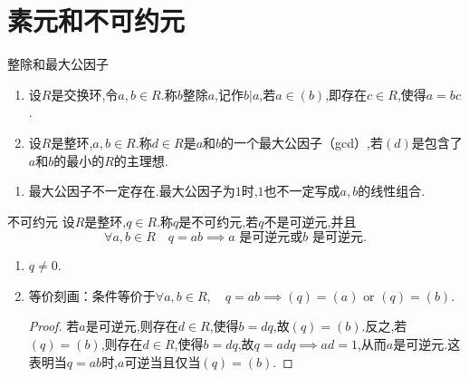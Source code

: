 \documentclass[lang=cn,12pt,color=green,fontset=none,pad]{elegantbook}
\begin{document}
\section{素元和不可约元}

\begin{definition}{整除和最大公因子}
    \begin{enumerate}
        \item 设$R$是交换环,令$a,b \in R$.称$b$整除$a$,记作$b|a$,若$a \in \left( b \right)$,即存在$c\in R$,使得$a=bc$.
        \item 设$R$是整环,$a,b \in R$.称$d \in R$是$a$和$b$的一个最大公因子（gcd）,若$\left( d \right)$是包含了$a$和$b$的最小的$R$的主理想.
    \end{enumerate}
    
\end{definition}

\begin{remark}
    \begin{enumerate}
        \item  最大公因子不一定存在.最大公因子为$1$时,$1$也不一定写成$a,b$的线性组合.

    \end{enumerate}
    
\end{remark}

\begin{definition}{不可约元}
    设$R$是整环,$q \in R$.称$q$是不可约元,若$q$不是可逆元,并且 $$ \forall a,b \in R\quad q=ab \implies a\text{ 是可逆元或}b\text{ 是可逆元}. $$
    
\end{definition}
\begin{remark}
    \begin{enumerate}
        \item $ q \neq  0 $. 
        \item 等价刻画：条件等价于$\forall a,b \in R,\quad q=ab\implies \left( q \right)=\left( a \right)\text{ or }\left( q \right)=\left( b \right)$.
        \begin{proof}
            若$a$是可逆元,则存在$d \in R$,使得$b=dq$,故$\left( q \right)=\left( b \right)$.反之,若$\left( q \right)=\left( b \right)$,则存在$d \in R$,使得$b= dq$,故$q=adq\implies ad=1$,从而$a$是可逆元.这表明当$q=ab$时,$a$可逆当且仅当$\left( q \right)=\left( b \right)$.
        \end{proof}
    \end{enumerate}
    
\end{remark}
\end{document}
